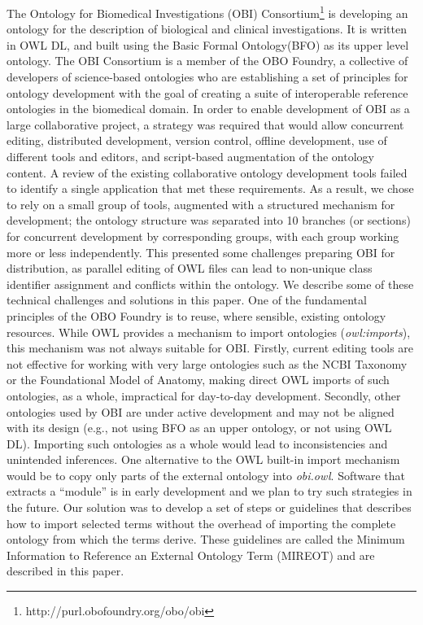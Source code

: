 \documentclass{elsart}       %
\begin{document}
The Ontology for Biomedical Investigations (OBI) Consortium\footnote{http://purl.obofoundry.org/obo/obi} is developing an ontology for the description of biological and clinical investigations.
It is written in OWL DL, and built using the Basic Formal Ontology(BFO)\cite{bfo} as its upper level ontology.
The OBI Consortium is a member of the OBO Foundry\cite{foundry}, a collective of developers of science-based ontologies who are establishing a set of principles for ontology development with the goal of creating a suite of interoperable reference ontologies in the biomedical domain. 
In order to enable development of OBI as a large collaborative project, a strategy was required that would allow concurrent editing, distributed development, version control, offline development, use of different tools and editors, and script-based augmentation of the ontology content.
A review of the existing collaborative ontology development tools failed to identify a single application that met these requirements.
As a result, we chose to rely on a small group of tools, augmented with a structured mechanism for development; the ontology structure was separated into 10 branches (or sections) for concurrent development by corresponding groups, with each group working more or less independently.
This presented some challenges preparing OBI for distribution, as parallel editing of OWL files can lead to non-unique class identifier assignment and conflicts within the ontology. We describe some of these technical challenges and solutions in this paper.
One of the fundamental principles of the OBO Foundry is to reuse, where sensible, existing ontology resources.
While OWL provides a mechanism to import ontologies (\emph{owl:imports}), this mechanism was not always suitable for OBI. Firstly, current editing tools are not effective for working with very large ontologies such as the NCBI Taxonomy\cite{ncbi} or the Foundational Model of Anatomy\cite{fma}, making direct OWL imports of such ontologies, as a whole, impractical for day-to-day development. Secondly, other ontologies used by OBI are under active development and may not be aligned with its design (e.g., not using BFO as an upper ontology, or not using OWL DL). Importing such ontologies as a whole would lead to inconsistencies and unintended inferences. 
One alternative to the OWL built-in import mechanism would be to copy only parts of the external ontology into \emph{obi.owl}. Software that extracts a ``module''\cite{module} is in early development and we plan to try such strategies in the future. 
Our solution was to develop a set of steps or guidelines that describes how to import selected terms without the overhead of importing the complete ontology from which the terms derive.
These guidelines are called the Minimum Information to Reference an External Ontology Term (MIREOT) and are described in this paper.
\end{document}
